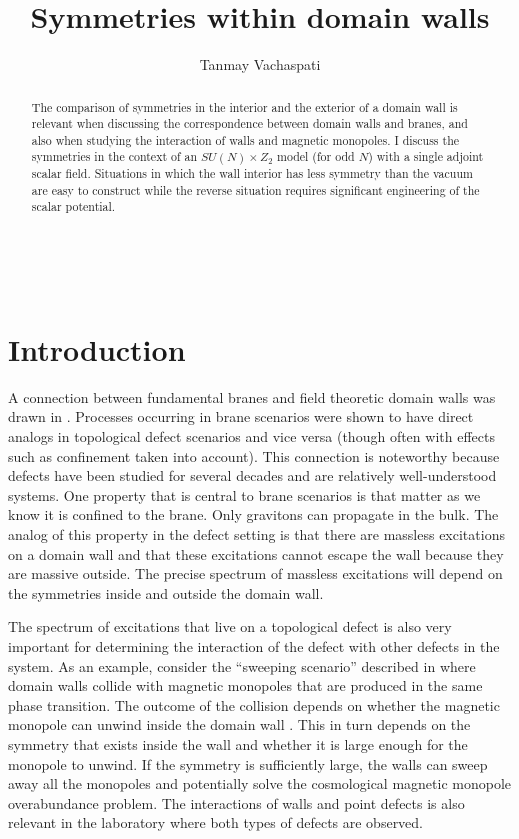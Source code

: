 \documentclass[a4paper,prd,nofootinbib,twocolumn,showpacs]{revtex4}
\begin{document}
\title{
Symmetries within domain walls
}

\author{Tanmay Vachaspati}

\begin{abstract}
The comparison of symmetries in the interior and the exterior 
of a domain wall is relevant when discussing the correspondence
between domain walls and branes, and also when studying the 
interaction of walls and magnetic monopoles. I discuss the symmetries
in the context of an $SU(N)\times Z_2$ model (for odd $N$) with a 
single adjoint scalar field. Situations in which the wall interior 
has less symmetry than the vacuum are easy to construct while the 
reverse situation requires significant engineering of the scalar 
potential. 
\end{abstract}


\

\maketitle

\section{Introduction}

A connection between fundamental branes and field theoretic domain 
walls was drawn in \cite{DvaShi97,DvaVil02}. Processes occurring
in brane scenarios were shown to have direct analogs in 
topological defect scenarios and vice versa (though often
with effects such as confinement taken into account). This 
connection is noteworthy because defects have been studied for 
several decades and are relatively well-understood systems. 
One property that is central to brane scenarios is that matter
as we know it is confined to the brane. Only gravitons can 
propagate in the bulk. The analog of this property in the defect 
setting is that there are massless excitations on a domain wall
and that these excitations cannot escape the wall because they
are massive outside. The precise spectrum of massless excitations
will depend on the symmetries inside and outside the domain wall.

The spectrum of excitations that live on a topological defect is 
also very important for determining the interaction of the defect
with other defects in the system. As an example, consider the
``sweeping scenario'' described in \cite{DvaLiuVac97} where
domain walls collide with magnetic monopoles that are produced
in the same phase transition. The outcome of the collision
depends on whether the magnetic monopole can unwind inside 
the domain wall \cite{PogVac00a,PogVac00b}. This in turn depends
on the symmetry that exists inside the wall and whether it is
large enough for the monopole to unwind. If the symmetry is
sufficiently large, the walls can sweep away all the monopoles
and potentially solve the cosmological magnetic monopole 
overabundance problem. The interactions of walls and point 
defects is also relevant in the laboratory where both types 
of defects are observed.
\end{document}
